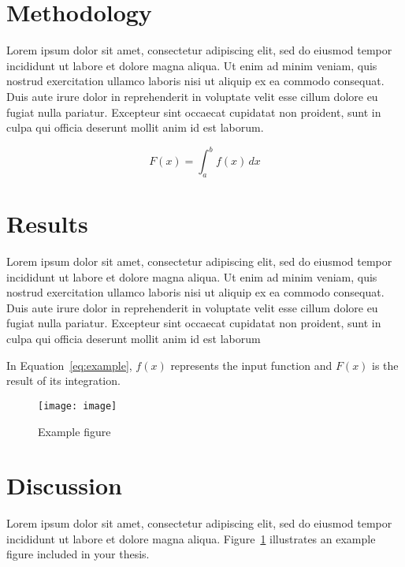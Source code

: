 \documentclass[conference]{IEEEtran}
\begin{document}
	\section{Methodology}
	Lorem ipsum dolor sit amet, consectetur adipiscing elit, sed do eiusmod tempor incididunt ut labore et dolore magna aliqua. Ut enim ad minim veniam, quis nostrud exercitation ullamco laboris nisi ut aliquip ex ea commodo consequat. Duis aute irure dolor in reprehenderit in voluptate velit esse cillum dolore eu fugiat nulla pariatur. Excepteur sint occaecat cupidatat non proident, sunt in culpa qui officia deserunt mollit anim id est laborum.
	
	\cite{russell2021human}
	
	\begin{equation}
		\label{eq:example}
		F(x) = \int_{a}^{b} f(x) \, dx
	\end{equation}
	
	\section{Results}
	Lorem ipsum dolor sit amet, consectetur adipiscing elit, sed do eiusmod tempor incididunt ut labore et dolore magna aliqua. Ut enim ad minim veniam, quis nostrud exercitation ullamco laboris nisi ut aliquip ex ea commodo consequat. Duis aute irure dolor in reprehenderit in voluptate velit esse cillum dolore eu fugiat nulla pariatur. Excepteur sint occaecat cupidatat non proident, sunt in culpa qui officia deserunt mollit anim id est laborum
		
	In Equation~\ref{eq:example}, $f(x)$ represents the input function and $F(x)$ is the result of its integration.
	\begin{figure}[htbp]
		\centering
		\texttt{[image: image]}
		\caption{Example figure}
		\label{fig:example}
	\end{figure}
	
	\section{Discussion}
	Lorem ipsum dolor sit amet, consectetur adipiscing elit, sed do eiusmod tempor incididunt ut labore et dolore magna aliqua. 
		Figure~\ref{fig:example} illustrates an example figure included in your thesis.
		
\end{document}
